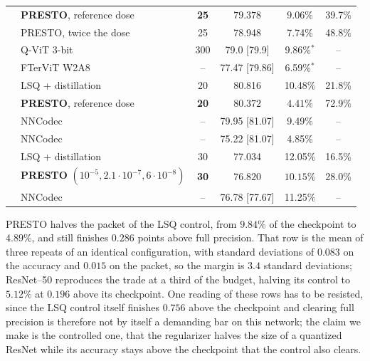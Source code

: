 \documentclass{article}
\begin{document}
\begin{table}[t]
\begin{tabular}{llcccc}
     & \textbf{PRESTO}, reference dose & \textbf{25} & $\mathbf{79.378}$ & $\mathbf{9.06\%}$ & 39.7\% \\
     & PRESTO, twice the dose & 25 & 78.948 & 7.74\% & 48.8\% \\
     & Q-ViT 3-bit \citep{li2022qvit} & 300 & 79.0 {\tiny[79.9]} & 9.86\%$^{*}$ & -- \\
     & FTerViT W2A8 \citep{rucinski2026ftervit} & -- & 77.47 {\tiny[79.86]} & 6.59\%$^{*}$ & -- \\
    \midrule
     & LSQ + distillation & 20 & 80.816 & 10.48\% & 21.8\% \\
     & \textbf{PRESTO}, reference dose & \textbf{20} & $\mathbf{80.372}$ & $\mathbf{4.41\%}$ & 72.9\% \\
     & NNCodec \citep{becking2023nncodec} & -- & 79.95 {\tiny[81.07]} & 9.49\% & -- \\
     & NNCodec \citep{becking2023nncodec} & -- & 75.22 {\tiny[81.07]} & 4.85\% & -- \\
    \midrule
     & LSQ + distillation & 30 & 77.034 & 12.05\% & 16.5\% \\
     & \textbf{PRESTO} $(10^{-5},2.1{\cdot}10^{-7},6{\cdot}10^{-8})$ & \textbf{30} & $\mathbf{76.820}$ & $\mathbf{10.15\%}$ & 28.0\% \\
     & NNCodec \citep{becking2023nncodec} & -- & 76.78 {\tiny[77.67]} & 11.25\% & -- \\
    \bottomrule
  \end{tabular}
\end{table}

PRESTO halves the packet of the LSQ control, from $9.84\%$ of the checkpoint to
$4.89\%$, and still finishes $0.286$ points above full precision. That row is the
mean of three repeats of an identical configuration, with standard deviations of
$0.083$ on the accuracy and $0.015$ on the packet, so the margin is $3.4$ standard
deviations; ResNet--50 reproduces the trade at a third of the budget, halving its
control to $5.12\%$ at $0.196$ above its checkpoint. One reading of these rows has
to be resisted, since the LSQ control itself finishes $0.756$ above the checkpoint
and clearing full precision is therefore not by itself a demanding bar on this
network; the claim we make is the controlled one, that the regularizer halves the
size of a quantized ResNet while its accuracy stays above the checkpoint that the
control also clears.
\end{document}
